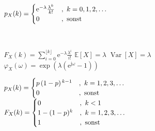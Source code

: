 \documentclass[8pt,a4paper,landscape]{extarticle}
\begin{document}
\begin{multicols*}{6}
\vspace{10pt}
\begin{varwidth}{\dimexpr{}\fboxsep\relax}
  \ensuremath{
    \begin{array}{lll}
      \hspace*{-5pt}
      p_X(k) = \begin{cases}
        \mathrm{e}^{-\lambda} \frac{\lambda^k}{k!} & ,\ k = 0,1,2,\ldots \\
        0 & ,\ \text{sonst}
      \end{cases} \\
      \hspace*{7pt}
    \end{array}
  }
\end{varwidth}
\vspace{5pt}

 \\
$F_X(k) = \sum_{i=0}^{\lfloor k\rfloor} \mathrm{e}^{-\lambda} \frac{\lambda^i}{i!}$
\vspace{26pt}
\vspace{5pt}
\vspace{-3pt}
\fsubcols
{\CheatsheetItemListStart
{}
\CheatsheetItemListEnd
$\mathbb{E}[X] = \lambda$
}
{
\CheatsheetItemListStart
{}
\CheatsheetItemListEnd
$\operatorname{Var}[X] = \lambda$
}
\vspace{4pt}
\CheatsheetItemListStart
{}
\CheatsheetItemListEnd
$\varphi_X(\omega) = \exp\left(\lambda \left(\mathrm{e}^{\mathrm{j}\omega} - 1\right)\right)$




\columnbreak

\vspace*{-10pt}



\vspace{20pt}
\begin{varwidth}{\dimexpr{}\fboxsep\relax}
  \ensuremath{
    \begin{array}{lll}
      \hspace*{-5pt}
      p_X(k) = \begin{cases}
        p\,(1-p)^{\,k-1} & ,\ k = 1,2,3,\dots \\
        0 & ,\ \text{sonst}
      \end{cases} \\[8pt]
      \hspace*{-5pt}
      F_X(k) = \begin{cases}
        0 & ,\ k < 1 \\
        1 - (1-p)^k & ,\ k = 1,2,3,\dots \\
        1 & ,\ \text{sonst}
      \end{cases}
    \end{array}
  }
\end{varwidth}
\vspace{10pt}


\end{multicols*}
\end{document}
